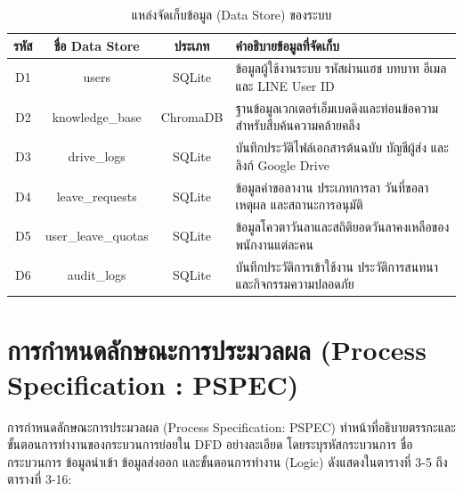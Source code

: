 \begin{table}[htbp]
\centering
\caption{แหล่งจัดเก็บข้อมูล (Data Store) ของระบบ}
\label{tab3:datastores}
\begin{tabularx}{\textwidth}{| c | c | c | L |}
\hline
\textbf{รหัส} & \textbf{ชื่อ Data Store} & \textbf{ประเภท} & \textbf{คำอธิบายข้อมูลที่จัดเก็บ} \\ \hline
D1 & users & SQLite & ข้อมูลผู้ใช้งานระบบ รหัสผ่านแฮช บทบาท อีเมล และ LINE User ID \\ \hline
D2 & knowledge\_base & ChromaDB & ฐานข้อมูลเวกเตอร์เอ็มเบดดิงและท่อนข้อความสำหรับสืบค้นความคล้ายคลึง \\ \hline
D3 & drive\_logs & SQLite & บันทึกประวัติไฟล์เอกสารต้นฉบับ บัญชีผู้ส่ง และลิงก์ Google Drive \\ \hline
D4 & leave\_requests & SQLite & ข้อมูลคำขอลางาน ประเภทการลา วันที่ขอลา เหตุผล และสถานะการอนุมัติ \\ \hline
D5 & user\_leave\_quotas & SQLite & ข้อมูลโควตาวันลาและสถิติยอดวันลาคงเหลือของพนักงานแต่ละคน \\ \hline
D6 & audit\_logs & SQLite & บันทึกประวัติการเข้าใช้งาน ประวัติการสนทนา และกิจกรรมความปลอดภัย \\ \hline
\end{tabularx}
\end{table}

\clearpage
\section{การกำหนดลักษณะการประมวลผล (Process Specification : PSPEC)}
\hspace*{1.3em}
การกำหนดลักษณะการประมวลผล (Process Specification: PSPEC) ทำหน้าที่อธิบายตรรกะและขั้นตอนการทำงานของกระบวนการย่อยใน DFD อย่างละเอียด โดยระบุรหัสกระบวนการ ชื่อกระบวนการ ข้อมูลนำเข้า ข้อมูลส่งออก และขั้นตอนการทำงาน (Logic) ดังแสดงในตารางที่ 3-5 ถึงตารางที่ 3-16:

